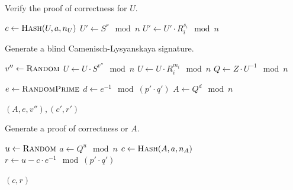 \begin{algorithm}
  \caption{Verify the proof of correctness for $U$.}
  \label{alg:CL-verify-U}
  \addtolength{\baselineskip}{1mm}
  \begin{algorithmic}[1]

      \State $c \gets \Call{Hash}{U, a, n_U}$
      \State $U' \gets S^r \mod n$
        \State $U' \gets U' \cdot R_i^{s_i} \mod n$
      \EndFor
        \Return {}
      \EndIf

      \Return {}
    \EndFunction
  \end{algorithmic}
\end{algorithm}

\begin{algorithm}
  \caption{Generate a blind Camenisch-Lysyanskaya signature.}
  \label{alg:CL-blind-sign}
  \addtolength{\baselineskip}{1mm}
  \begin{algorithmic}[1]

      \State $v'' \gets \Call{Random}{}$
      \State $U \gets U \cdot S^{v''} \mod n$
        \State $U \gets U \cdot R_i^{m_i} \mod n$
      \EndFor
      \State $Q \gets Z \cdot U^{-1} \mod n$

      \State $e \gets \Call{RandomPrime}{}$
      \State $d \gets e^{-1} \mod (p' \cdot q')$
      \State $A \gets Q^d \mod n$

      \Return $(A, e, v''), (c', r')$
    \EndFunction
  \end{algorithmic}
\end{algorithm}

\begin{algorithm}
  \caption{Generate a proof of correctness or $A$.}
  \label{alg:CL-proof-A}
  \addtolength{\baselineskip}{1mm}
  \begin{algorithmic}[1]
      \State $u \gets \Call{Random}{}$
      \State $a \gets Q^u \mod n$
      \State $c \gets \Call{Hash}{A, a, n_A}$
      \State $r \gets u - c \cdot e^{-1} \mod (p' \cdot q')$

      \Return $(c, r)$
    \EndFunction
  \end{algorithmic}
\end{algorithm}

